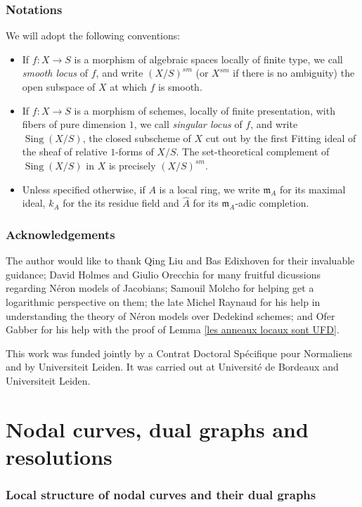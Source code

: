 \documentclass[a4paper,10pt,twoside]{article}
\DeclareMathOperator{\sing}{Sing}
\theoremstyle{definition}
\theoremstyle{remark}
\begin{document}
\section*{Notations}

We will adopt the following conventions:
\begin{itemize}
\item If $f \colon X \to S$ is a morphism of algebraic spaces locally of finite type, we call \emph{smooth locus} of $f$, and write $(X/S)^{sm}$ (or $X^{sm}$ if there is no ambiguity) the open subspace of $X$ at which $f$ is smooth.
\item If $f \colon X \to S$ is a morphism of schemes, locally of finite presentation, with fibers of pure dimension $1$, we call \emph{singular locus} of $f$, and write $\sing(X/S)$, the closed subscheme of $X$ cut out by the first Fitting ideal of the sheaf of relative $1$-forms of $X/S$. The set-theoretical complement of $\sing(X/S)$ in $X$ is precisely $(X/S)^{sm}$.
\item Unless specified otherwise, if $A$ is a local ring, we write $\mathfrak{m}_A$ for its maximal ideal, $k_A$ for the its residue field and $\widehat{A}$ for its $\mathfrak{m}_A$-adic completion.
\end{itemize}

\section*{Acknowledgements}

The author would like to thank Qing Liu and Bas Edixhoven for their invaluable guidance; David Holmes and Giulio Orecchia for many fruitful dicussions regarding Néron models of Jacobians; Samouil Molcho for helping get a logarithmic perspective on them; the late Michel Raynaud for his help in understanding the theory of Néron models over Dedekind schemes; and Ofer Gabber for his help with the proof of Lemma \ref{les anneaux locaux sont UFD}.

This work was funded jointly by a Contrat Doctoral Spécifique pour Normaliens and by Universiteit Leiden. It was carried out at
Universit\'e de Bordeaux and Universiteit Leiden.



\part{Nodal curves, dual graphs and resolutions}\label{part1}

\section{Local structure of nodal curves and their dual graphs}\label{section_intro1} 
\end{document}
